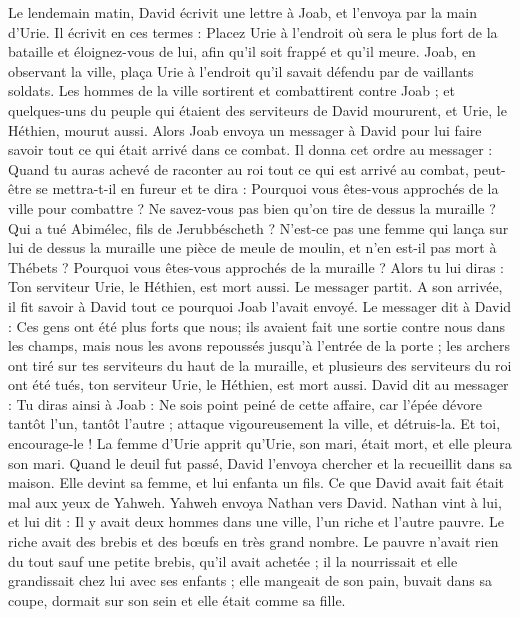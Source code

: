 \begin{multicols}{2}
Le lendemain matin, David écrivit une lettre à Joab, et l'envoya par la main d'Urie.
Il écrivit en ces termes : Placez Urie à l'endroit où sera le plus fort de la bataille et éloignez-vous de lui, afin qu'il soit frappé et qu'il meure.
Joab, en observant la ville, plaça Urie à l'endroit qu'il savait défendu par de vaillants soldats.
Les hommes de la ville sortirent et combattirent contre Joab ; et quelques-uns du peuple qui étaient des serviteurs de David moururent, et Urie, le Héthien, mourut aussi.
Alors Joab envoya un messager à David pour lui faire savoir tout ce qui était arrivé dans ce combat.
Il donna cet ordre au messager : Quand tu auras achevé de raconter au roi tout ce qui est arrivé au combat, peut-être se mettra-t-il en fureur et te dira : Pourquoi vous êtes-vous approchés de la ville pour combattre ? Ne savez-vous pas bien qu'on tire de dessus la muraille ?
Qui a tué Abimélec, fils de Jerubbéscheth ? N'est-ce pas une femme qui lança sur lui de dessus la muraille une pièce de meule de moulin, et n'en est-il pas mort à Thébets ? Pourquoi vous êtes-vous approchés de la muraille ? Alors tu lui diras : Ton serviteur Urie, le Héthien, est mort aussi.
Le messager partit. A son arrivée, il fit savoir à David tout ce pourquoi Joab l'avait envoyé.
Le messager dit à David : Ces gens ont été plus forts que nous; ils avaient fait une sortie contre nous dans les champs, mais nous les avons repoussés jusqu'à l'entrée de la porte ;
les archers ont tiré sur tes serviteurs du haut de la muraille, et plusieurs des serviteurs du roi ont été tués, ton serviteur Urie, le Héthien, est mort aussi.
David dit au messager : Tu diras ainsi à Joab : Ne sois point peiné de cette affaire, car l'épée dévore tantôt l'un, tantôt l'autre ; attaque vigoureusement la ville, et détruis-la. Et toi, encourage-le !
La femme d'Urie apprit qu'Urie, son mari, était mort, et elle pleura son mari.
Quand le deuil fut passé, David l'envoya chercher et la recueillit dans sa maison. Elle devint sa femme, et lui enfanta un fils. Ce que David avait fait était mal aux yeux de Yahweh.
\VerseOne{}Yahweh envoya Nathan vers David. Nathan vint à lui, et lui dit : Il y avait deux hommes dans une ville, l'un riche et l'autre pauvre.
Le riche avait des brebis et des bœufs en très grand nombre.
Le pauvre n'avait rien du tout sauf une petite brebis, qu'il avait achetée ; il la nourrissait et elle grandissait chez lui avec ses enfants ; elle mangeait de son pain, buvait dans sa coupe, dormait sur son sein et elle était comme sa fille.

\end{multicols}
